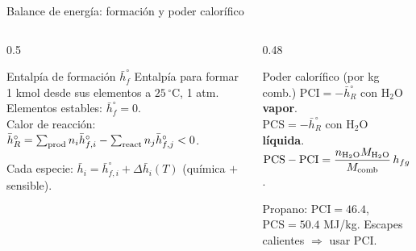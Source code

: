 \documentclass[aspectratio=169,10pt]{beamer}
\begin{document}
\begin{frame}{Balance de energía: formación y poder calorífico}
\begin{columns}[T]
\begin{column}{0.5\textwidth}
\begin{cardidea}{Entalpía de formación $\bar h_f^\circ$}{\faSuperscript}
\footnotesize
Entalpía para formar 1 kmol desde sus elementos a $25\,^\circ$C, 1 atm. Elementos estables: $\bar h_f^\circ=0$.\\[0.5mm]
Calor de reacción:\\
$\bar h_R^\circ=\sum_{\rm prod}n_i\bar h_{f,i}^\circ-\sum_{\rm react}n_j\bar h_{f,j}^\circ<0$.
\end{cardidea}
\vspace{0.8mm}
\begin{cardnota}[\faInfoCircle]
\footnotesize
Cada especie: $\bar h_i=\bar h_{f,i}^\circ+\Delta\bar h_i(T)$ (química $+$ sensible).
\end{cardnota}
\end{column}
\begin{column}{0.48\textwidth}
\begin{cardgear}{Poder calorífico (por kg comb.)}{\faFire}
\footnotesize
$\mathrm{PCI}=-\bar h_R^\circ$ con $\mathrm{H_2O}$ \textbf{vapor}.\\[0.4mm]
$\mathrm{PCS}=-\bar h_R^\circ$ con $\mathrm{H_2O}$ \textbf{líquida}.\\[0.4mm]
$\mathrm{PCS}-\mathrm{PCI}=\dfrac{n_{\rm H_2O}M_{\rm H_2O}}{M_{\rm comb}}\,h_{fg}$.
\end{cardgear}
\vspace{0.8mm}
\begin{cardnota}[\faCalculator]
\footnotesize
Propano: $\mathrm{PCI}=46.4$, $\mathrm{PCS}=50.4$ MJ/kg. Escapes calientes $\Rightarrow$ usar PCI.
\end{cardnota}
\end{column}
\end{columns}
\end{frame}
\end{document}
